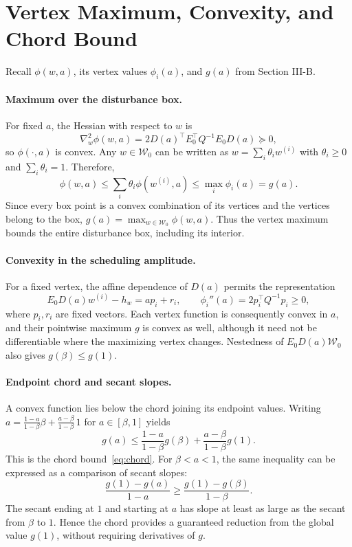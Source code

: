 \documentclass[11pt,a4paper]{article}
\numberwithin{equation}{section}
\theoremstyle{remark}\newtheorem{remark}{Remark}
\newcommand{\cW}{\mathcal W}
\begin{document}
\section{Vertex Maximum, Convexity, and Chord Bound}\label{app:vertex-convexity}
Recall $\phi(w,a)$, its vertex values $\phi_i(a)$, and $g(a)$ from Section III-B.
\paragraph{Maximum over the disturbance box.}
For fixed $a$, the Hessian with respect to $w$ is
\[
\nabla_w^2\phi(w,a)=2D(a)^\top E_0^\top Q^{-1}E_0D(a)\succeq0,
\]
so $\phi(\cdot,a)$ is convex. Any $w\in\cW_0$ can be written as $w=\sum_i\theta_iw^{(i)}$ with $\theta_i\ge0$ and $\sum_i\theta_i=1$. Therefore,
\[
\phi(w,a)\le\sum_i\theta_i\phi(w^{(i)},a)\le\max_i\phi_i(a)=g(a).
\]
Since every box point is a convex combination of its vertices and the vertices belong to the box, $g(a)=\max_{w\in\cW_0}\phi(w,a)$. Thus the vertex maximum bounds the entire disturbance box, including its interior.

\paragraph{Convexity in the scheduling amplitude.}
For a fixed vertex, the affine dependence of $D(a)$ permits the representation
\[
E_0D(a)w^{(i)}-h_w=a p_i+r_i,
\qquad
\phi_i''(a)=2p_i^\top Q^{-1}p_i\ge0,
\]
where $p_i,r_i$ are fixed vectors. Each vertex function is consequently convex in $a$, and their pointwise maximum $g$ is convex as well, although it need not be differentiable where the maximizing vertex changes. Nestedness of $E_0D(a)\cW_0$ also gives $g(\beta)\le g(1)$.


\paragraph{Endpoint chord and secant slopes.}
A convex function lies below the chord joining its endpoint values. Writing
$a=\frac{1-a}{1-\beta}\beta+\frac{a-\beta}{1-\beta}\,1$ for $a\in[\beta,1]$ yields
\[
g(a)\le\frac{1-a}{1-\beta}g(\beta)+\frac{a-\beta}{1-\beta}g(1).
\]
This is the chord bound~\eqref{eq:chord}. For $\beta<a<1$, the same inequality can be expressed as a comparison of secant slopes:
\[
\frac{g(1)-g(a)}{1-a}\ge\frac{g(1)-g(\beta)}{1-\beta}.
\]
The secant ending at $1$ and starting at $a$ has slope at least as large as the secant from $\beta$ to $1$. Hence the chord provides a guaranteed reduction from the global value $g(1)$, without requiring derivatives of $g$.
\end{document}
